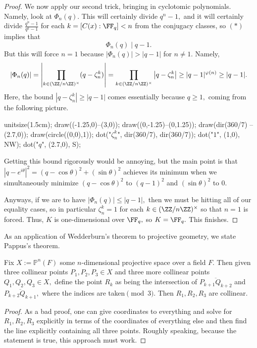 \documentclass[../notes.tex]{subfiles}
\begin{document}
\begin{proof}
	We now apply our second trick, bringing in cyclotomic polynomials. Namely, look at $\Phi_n(q).$ This will certainly divide $q^n-1,$ and it will certainly divide $\frac{q^n-1}{q^k-1}$ for each $k=[C(x):\FF_q]<n$ from the conjugacy classes, so $(*)$ implies that
	\[\Phi_n(q)\mid q-1.\]
	But this will force $n=1$ because $|\Phi_n(q)|>|q-1|$ for $n\ne1.$ Namely,
	\[\left|\Phi_n(q)\right|=\left|\prod_{k\in(\ZZ/n\ZZ)^\times}(q-\zeta_n^k)\right|=\prod_{k\in(\ZZ/n\ZZ)^\times}\left|q-\zeta_n^k\right|\ge|q-1|^{\varphi(n)}\ge|q-1|.\]
	Here, the bound $\left|q-\zeta_n^k\right|\ge|q-1|$ comes essentially because $q\ge1,$ coming from the following picture.
	\begin{center}
		\begin{asy}
			unitsize(1.5cm);
			draw((-1.25,0)--(3,0));
			draw((0,-1.25)--(0,1.25));
			draw(dir(360/7) -- (2.7,0));
			draw(circle((0,0),1));
			dot("$\zeta_n^k$", dir(360/7), dir(360/7));
			dot("$1$", (1,0), NW);
			dot("$q$", (2.7,0), S);
		\end{asy}
	\end{center}
	Getting this bound rigorously would be annoying, but the main point is that $\left|q-e^{i\theta}\right|^2=(q-\cos\theta)^2+(\sin\theta)^2$ achieves its minimum when we simultaneously minimize $(q-\cos\theta)^2$ to $(q-1)^2$ and $(\sin\theta)^2$ to $0.$

	Anyways, if we are to have $|\Phi_n(q)|\le|q-1|,$ then we must be hitting all of our equality cases, so in particular $\zeta_n^k=1$ for each $k\in(\ZZ/n\ZZ)^\times$ so that $n=1$ is forced. Thus, $K$ is one-dimensional over $\FF_q,$ so $K=\FF_q.$ This finishes.
\end{proof}
As an application of {Wedderburn}'s theorem to projective geometry, we state Pappus's theorem.
\begin{theorem}[Pappus]
	Fix $X:=\mathbb P^n(F)$ some $n$-dimensional projective space over a field $F.$ Then given three collinear points $P_1,P_2,P_3\in X$ and three more collinear points $Q_1,Q_2,Q_3\in X,$ define the point $R_k$ as being the intersection of $\overline{P_{k+1}Q_{k+2}}$ and $\overline{P_{k+2}Q_{k+1}},$ where the indices are taken$\pmod3.$ Then $R_1,R_2,R_3$ are collinear.
\end{theorem}
\begin{proof}
	As a bad proof, one can give coordinates to everything and solve for $R_1,R_2,R_3$ explicitly in terms of the coordinates of everything else and then find the line explicitly containing all three points. Roughly speaking, because the statement is true, this approach must work.
\end{proof}
\end{document}
